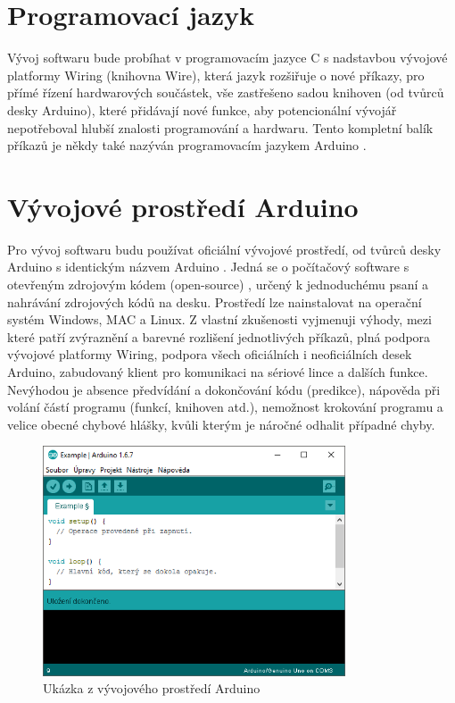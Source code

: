 \documentclass[FM,MP]{tulthesis}  %
\begin{document}
\section{Programovací jazyk}
Vývoj softwaru bude probíhat v programovacím jazyce C s nadstavbou vývojové platformy Wiring  (knihovna Wire)\cite{Arduino acce}, která jazyk rozšiřuje o nové příkazy, pro přímé řízení hardwarových součástek, vše zastřešeno sadou knihoven \cite{Arduino lib} (od tvůrců desky Arduino), které přidávají nové funkce, aby potencionální vývojář nepotřeboval hlubší znalosti programování a hardwaru. Tento kompletní balík příkazů \cite{Arduino lang} je někdy také nazýván programovacím jazykem Arduino \cite{Arduino intro}.

\section{Vývojové prostředí Arduino}
Pro vývoj softwaru budu používat oficiální vývojové prostředí, od tvůrců desky Arduino s identickým názvem Arduino \cite{Arduino soft}. Jedná se o počítačový software s otevřeným zdrojovým kódem (open-source) \cite{Arduino source}, určený k jednoduchému psaní a nahrávání zdrojových kódů na desku. Prostředí lze nainstalovat na operační systém Windows, MAC a Linux. Z vlastní zkušenosti vyjmenuji výhody, mezi které patří zvýraznění a barevné rozlišení jednotlivých příkazů, plná podpora vývojové platformy Wiring, podpora všech oficiálních i neoficiálních desek Arduino, zabudovaný klient pro komunikaci na sériové lince a dalších funkce. Nevýhodou je absence předvídání a dokončování kódu (predikce), nápověda při volání částí programu (funkcí, knihoven atd.), nemožnost krokování programu a velice obecné chybové hlášky, kvůli kterým je náročné odhalit případné chyby.

\begin{figure}[H]
\begin{center}
\includegraphics[width=0.8\textwidth]{images/arduino-ide.png}
\caption{Ukázka z vývojového prostředí Arduino}
\label{image}
\end{center}
\end{figure}
\end{document}
